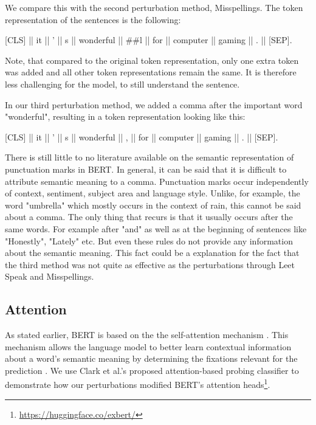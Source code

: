We compare this with the second perturbation method, Misspellings. The token representation of the sentences is the following:

{[}CLS{]}  ||  it  ||  '  ||  s  ||  wonderful  ||  \#\#l  ||  for  ||  computer  ||  gaming  ||  .  ||  {[}SEP{]}.

Note, that compared to the original token representation, only one extra token was added and all other token representations remain the same. It is therefore less challenging for the model, to still understand the sentence. 


In our third perturbation method, we added a comma after the important word "wonderful", resulting in a token representation looking like this:

{[}CLS{]}  ||  it  ||  '  ||  s  ||  wonderful  || , ||  for  ||  computer  ||  gaming  ||  .  ||  {[}SEP{]}.

There is still little to no literature available on the semantic representation of punctuation marks in BERT. In general, it can be said that it is difficult to attribute semantic meaning to a comma. Punctuation marks occur independently of context, sentiment, subject area and language style. Unlike, for example, the word "umbrella" which mostly occurs in the context of rain, this cannot be said about a comma. The only thing that recurs is that it usually occurs after the same words. For example after "and" as well as at the beginning of sentences like "Honestly", "Lately" etc. But even these rules do not provide any information about the semantic meaning. This fact could be a explanation for the fact that the third method was not quite as effective as the perturbations through Leet Speak and Misspellings.


\subsection{Attention}
As stated earlier, BERT is based on the the self-attention mechanism \cite{devlin2018bert}. This mechanism allows the language model to better learn contextual information about a word’s semantic meaning by determining the fixations relevant for the prediction \cite{vaswani2017attention}. We use Clark et al.'s proposed attention-based probing classifier to demonstrate how our perturbations modified BERT's attention heads\footnote{\url{https://huggingface.co/exbert/}}\cite{clark2019does}. 

